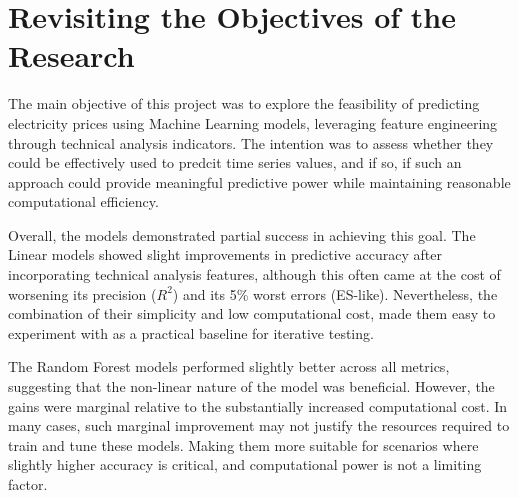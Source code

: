 \documentclass[12pt]{report} %
\begin{document}

\section{Revisiting the Objectives of the Research} %




The main objective of this project was to explore the feasibility of predicting electricity prices using Machine Learning models, leveraging feature engineering through technical analysis indicators. The intention was to assess whether they could be effectively used to predcit time series values, and if so, if such an approach could provide meaningful predictive power while maintaining reasonable computational efficiency.

Overall, the models demonstrated partial success in achieving this goal. The Linear models showed slight improvements in predictive accuracy after incorporating technical analysis features, although this often came at the cost of worsening its precision ($R^2$) and its 5\% worst errors (ES-like). Nevertheless, the combination of their simplicity and low computational cost, made them easy to experiment with as a practical baseline for iterative testing.

The Random Forest models performed slightly better across all metrics, suggesting that the non-linear nature of the model was beneficial. However, the gains were marginal relative to the substantially increased computational cost. In many cases, such marginal improvement may not justify the resources required to train and tune these models. Making them more suitable for scenarios where slightly higher accuracy is critical, and computational power is not a limiting factor.
\end{document}
